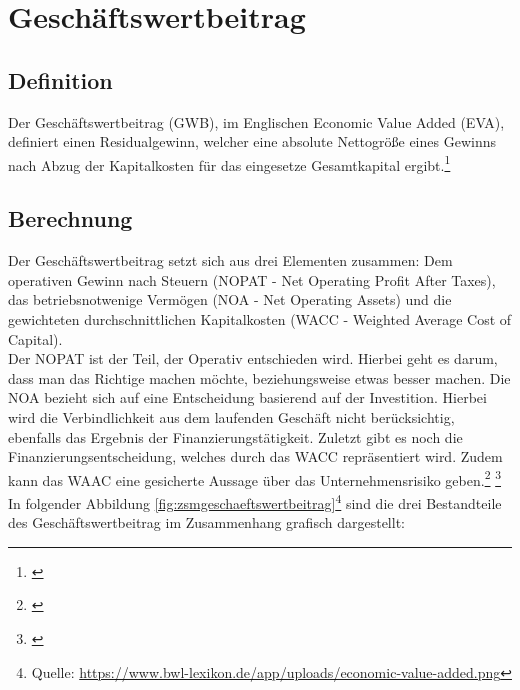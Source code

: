 \chapter{Geschäftswertbeitrag}
\label{Geschaeftswertbeitrag}

\section{Definition}
Der Geschäftswertbeitrag (GWB), im Englischen Economic Value Added (EVA), definiert einen Residualgewinn, welcher eine absolute Nettogröße eines Gewinns nach Abzug der Kapitalkosten für das eingesetze Gesamtkapital ergibt.\footnote{\cite{wikipedia-eva}}

\section{Berechnung}

Der Geschäftswertbeitrag setzt sich aus drei Elementen zusammen: Dem operativen Gewinn nach Steuern (NOPAT - Net Operating Profit After Taxes), das betriebsnotwenige Vermögen (NOA - Net Operating Assets) und die gewichteten durchschnittlichen Kapitalkosten (WACC - Weighted Average Cost of Capital).\\
Der NOPAT ist der Teil, der Operativ entschieden wird. Hierbei geht es darum, dass man das Richtige machen möchte, beziehungsweise etwas besser machen. Die NOA bezieht sich auf eine Entscheidung basierend auf der Investition. Hierbei wird die Verbindlichkeit aus dem laufenden Geschäft nicht berücksichtig, ebenfalls das Ergebnis der Finanzierungstätigkeit. Zuletzt gibt es noch die Finanzierungsentscheidung, welches durch das WACC repräsentiert wird. Zudem kann das WAAC eine gesicherte Aussage über das Unternehmensrisiko geben.\footnote{\cite{bwllexicon-eva}} \footnote{\cite{wikipedia-eva}}\\
In folgender Abbildung \ref{fig:zsmgeschaeftswertbeitrag}\footnote{Quelle: \url{https://www.bwl-lexikon.de/app/uploads/economic-value-added.png}} sind die drei Bestandteile des Geschäftswertbeitrag im Zusammenhang grafisch dargestellt:

